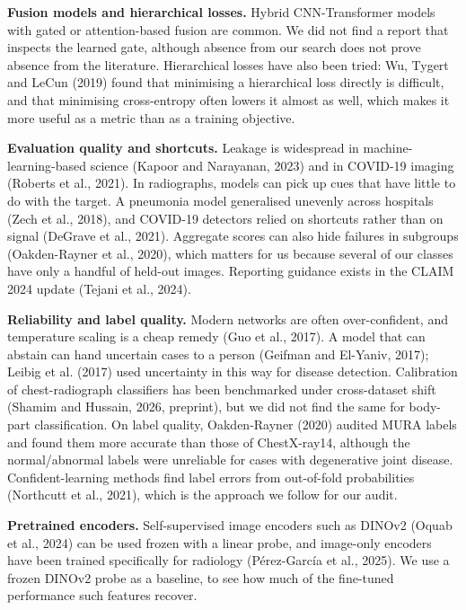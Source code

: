 

\textbf{Fusion models and hierarchical losses.} Hybrid CNN-Transformer models with gated or attention-based fusion are common. We did not find a report that inspects the learned gate, although absence from our search does not prove absence from the literature. Hierarchical losses have also been tried: Wu, Tygert and LeCun (2019) found that minimising a hierarchical loss directly is difficult, and that minimising cross-entropy often lowers it almost as well, which makes it more useful as a metric than as a training objective.

\textbf{Evaluation quality and shortcuts.} Leakage is widespread in machine-learning-based science (Kapoor and Narayanan, 2023) and in COVID-19 imaging (Roberts et al., 2021). In radiographs, models can pick up cues that have little to do with the target. A pneumonia model generalised unevenly across hospitals (Zech et al., 2018), and COVID-19 detectors relied on shortcuts rather than on signal (DeGrave et al., 2021). Aggregate scores can also hide failures in subgroups (Oakden-Rayner et al., 2020), which matters for us because several of our classes have only a handful of held-out images. Reporting guidance exists in the CLAIM 2024 update (Tejani et al., 2024).

\textbf{Reliability and label quality.} Modern networks are often over-confident, and temperature scaling is a cheap remedy (Guo et al., 2017). A model that can abstain can hand uncertain cases to a person (Geifman and El-Yaniv, 2017); Leibig et al. (2017) used uncertainty in this way for disease detection. Calibration of chest-radiograph classifiers has been benchmarked under cross-dataset shift (Shamim and Hussain, 2026, preprint), but we did not find the same for body-part classification. On label quality, Oakden-Rayner (2020) audited MURA labels and found them more accurate than those of ChestX-ray14, although the normal/abnormal labels were unreliable for cases with degenerative joint disease. Confident-learning methods find label errors from out-of-fold probabilities (Northcutt et al., 2021), which is the approach we follow for our audit.

\textbf{Pretrained encoders.} Self-supervised image encoders such as DINOv2 (Oquab et al., 2024) can be used frozen with a linear probe, and image-only encoders have been trained specifically for radiology (Pérez-García et al., 2025). We use a frozen DINOv2 probe as a baseline, to see how much of the fine-tuned performance such features recover.

